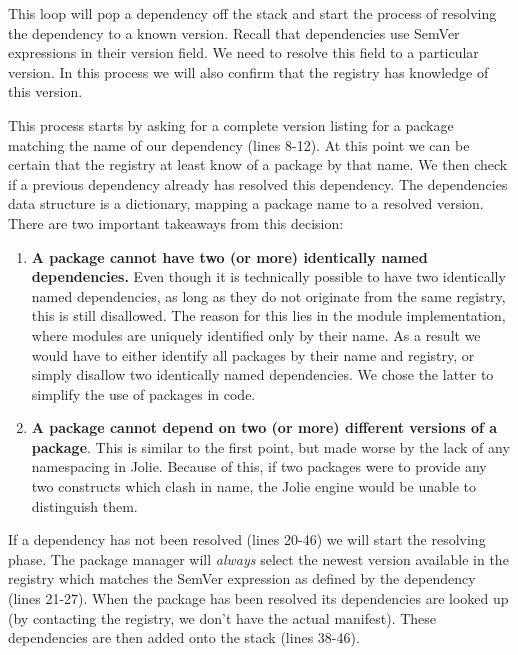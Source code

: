 This loop will pop a dependency off the stack and start the process of
resolving the dependency to a known version. Recall that dependencies use
SemVer expressions in their version field. We need to resolve this field to a
particular version. In this process we will also confirm that the registry has
knowledge of this version.

This process starts by asking for a complete version listing for a package
matching the name of our dependency (lines 8-12). At this point we can be
certain that the registry at least know of a package by that name. We then
check if a previous dependency already has resolved this dependency.
The  dependencies data structure is a dictionary, mapping
a package name to a resolved version. There are two important takeaways from
this decision:

\begin{enumerate}

\item \textbf{A package cannot have two (or more) identically named
    dependencies.} Even though it is technically possible to have two
    identically named dependencies, as long as they do not originate from the
    same registry, this is still disallowed. The reason for this lies in the
    module implementation, where modules are uniquely identified only by their
    name. As a result we would have to either identify all packages by their
    name and registry, or simply disallow two identically named dependencies.
    We chose the latter to simplify the use of packages in code.

\item \textbf{A package cannot depend on two (or more) different versions of a
    package}. This is similar to the first point, but made worse by the lack
    of any namespacing in Jolie. Because of this, if two packages were to
    provide any two constructs which clash in name, the Jolie engine would be
    unable to distinguish them.

\end{enumerate}

If a dependency has not been resolved (lines 20-46) we will start the resolving
phase. The package manager will \emph{always} select the newest version
available in the registry which matches the SemVer expression as defined by the
dependency (lines 21-27). When the package has been resolved its dependencies
are looked up (by contacting the registry, we don't have the actual manifest).
These dependencies are then added onto the stack (lines 38-46).

